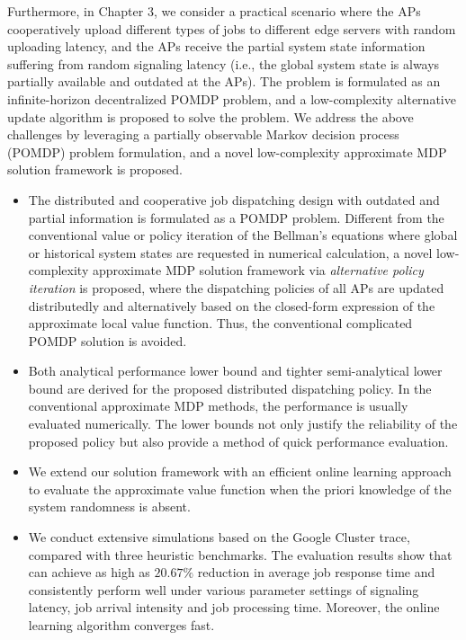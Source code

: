 Furthermore, in Chapter 3, we consider a practical scenario where the APs cooperatively upload different types of jobs to different edge servers with random uploading latency, and the APs receive the partial system state information suffering from random signaling latency (i.e., the global system state is always partially available and outdated at the APs).
The problem is formulated as an infinite-horizon decentralized POMDP problem, and a low-complexity alternative update algorithm is proposed to solve the problem.
We address the above challenges by leveraging a partially observable Markov decision process (POMDP) problem formulation, and a novel low-complexity approximate MDP solution framework is proposed.
\begin{itemize}
    \item The distributed and cooperative job dispatching design with outdated and partial information is formulated as a POMDP problem.
    Different from the conventional value or policy iteration of the Bellman's equations where global or historical system states are requested in numerical calculation, a novel low-complexity approximate MDP solution framework via \emph{alternative policy iteration} is proposed, where the dispatching policies of all APs are updated distributedly and alternatively based on the {closed-form expression} of the approximate local value function.
    Thus, the conventional complicated POMDP solution is avoided.
    \item Both analytical performance lower bound and tighter semi-analytical lower bound are derived for the proposed distributed dispatching policy. In the conventional approximate MDP methods, the performance is usually evaluated numerically.
    The lower bounds not only justify the reliability of the proposed policy but also provide a method of quick performance evaluation.
    \item We extend our solution framework {\Dalgname} with an efficient online learning approach to evaluate the approximate value function when the priori knowledge of the system randomness is absent.
    \item We conduct extensive simulations based on the Google Cluster trace, compared with three heuristic benchmarks. The evaluation results show that {\Dalgname} can achieve as high as $20.67\%$ reduction in average job response time and consistently perform well under various parameter settings of signaling latency, job arrival intensity and job processing time. {Moreover, the online learning algorithm converges fast.}
\end{itemize}

